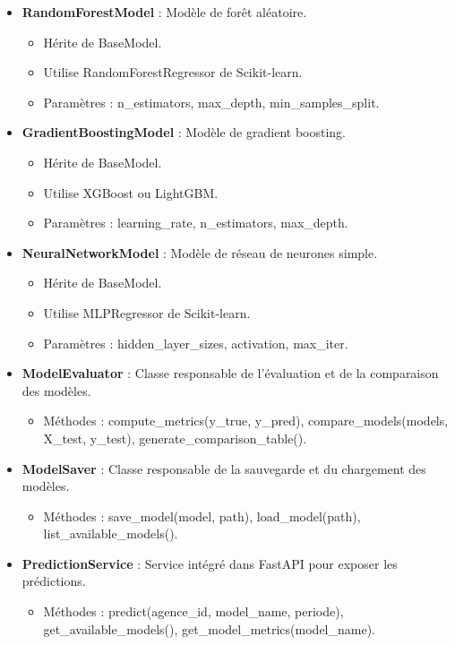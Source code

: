 \begin{itemize}
    \item \textbf{RandomForestModel} : Modèle de forêt aléatoire.
        \begin{itemize}
            \item Hérite de BaseModel.
            \item Utilise RandomForestRegressor de Scikit-learn.
            \item Paramètres : n\_estimators, max\_depth, min\_samples\_split.
        \end{itemize}
    
    \item \textbf{GradientBoostingModel} : Modèle de gradient boosting.
        \begin{itemize}
            \item Hérite de BaseModel.
            \item Utilise XGBoost ou LightGBM.
            \item Paramètres : learning\_rate, n\_estimators, max\_depth.
        \end{itemize}
    
    \item \textbf{NeuralNetworkModel} : Modèle de réseau de neurones simple.
        \begin{itemize}
            \item Hérite de BaseModel.
            \item Utilise MLPRegressor de Scikit-learn.
            \item Paramètres : hidden\_layer\_sizes, activation, max\_iter.
        \end{itemize}
    
    \item \textbf{ModelEvaluator} : Classe responsable de l'évaluation et de la comparaison des modèles.
        \begin{itemize}
            \item Méthodes : compute\_metrics(y\_true, y\_pred), compare\_models(models, X\_test, y\_test), generate\_comparison\_table().
        \end{itemize}
    
    \item \textbf{ModelSaver} : Classe responsable de la sauvegarde et du chargement des modèles.
        \begin{itemize}
            \item Méthodes : save\_model(model, path), load\_model(path), list\_available\_models().
        \end{itemize}
    
    \item \textbf{PredictionService} : Service intégré dans FastAPI pour exposer les prédictions.
        \begin{itemize}
            \item Méthodes : predict(agence\_id, model\_name, periode), get\_available\_models(), get\_model\_metrics(model\_name).
        \end{itemize}
\end{itemize}

